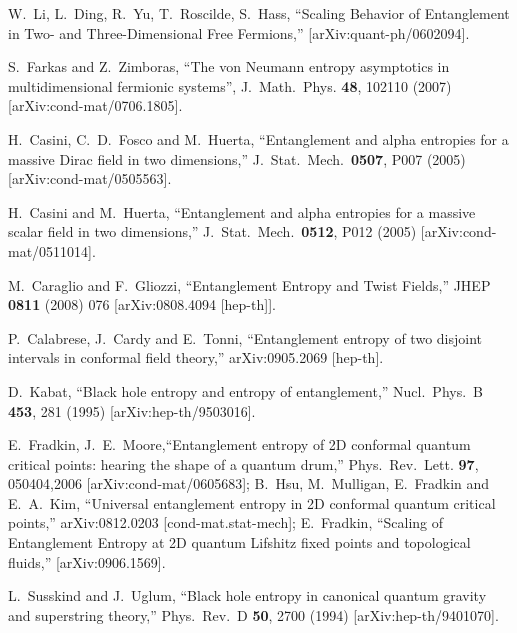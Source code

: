 \documentclass[12pt]{article}
\begin{document}
\begin{thebibliography}{99}
W.\ Li, L.\ Ding, R.\ Yu, T.\ Roscilde, S.\ Hass,
``Scaling Behavior
of Entanglement in Two- and Three-Dimensional Free Fermions,''
[arXiv:quant-ph/0602094].

S.\ Farkas and Z.\ Zimboras,
``The von Neumann entropy asymptotics in multidimensional fermionic systems'',
J.\ Math.\ Phys. {\bf 48},  102110 (2007)
 [arXiv:cond-mat/0706.1805].


H.~Casini, C.~D.~Fosco and M.~Huerta,
  ``Entanglement and alpha entropies for a massive Dirac field in two
  dimensions,''
  J.\ Stat.\ Mech.\  {\bf 0507}, P007 (2005)
  [arXiv:cond-mat/0505563].



  H.~Casini and M.~Huerta,
  ``Entanglement and alpha entropies for a massive scalar field in two
  dimensions,''
  J.\ Stat.\ Mech.\  {\bf 0512}, P012 (2005)
  [arXiv:cond-mat/0511014].

  M.~Caraglio and F.~Gliozzi,
  ``Entanglement Entropy and Twist Fields,''
  JHEP {\bf 0811} (2008) 076
  [arXiv:0808.4094 [hep-th]].


  P.~Calabrese, J.~Cardy and E.~Tonni,
  ``Entanglement entropy of two disjoint intervals in conformal field
theory,''
  arXiv:0905.2069 [hep-th].




 D.~Kabat,
  ``Black hole entropy and entropy of entanglement,''
  Nucl.\ Phys.\ B {\bf 453}, 281 (1995)
  [arXiv:hep-th/9503016].




E.~Fradkin, J.~E.~Moore,``Entanglement entropy of 2D conformal quantum critical points: 
hearing the shape of a quantum drum,'' 
Phys.\ Rev.\ Lett. {\bf 97}, 050404,2006
[arXiv:cond-mat/0605683];
B.~Hsu, M.~Mulligan, E.~Fradkin and E.~A.~Kim,
  ``Universal entanglement entropy in 2D conformal quantum critical points,''
  arXiv:0812.0203 [cond-mat.stat-mech];
E.~Fradkin, ``Scaling of Entanglement Entropy at 2D quantum Lifshitz fixed points and topological fluids,''
[arXiv:0906.1569].
 


 

  L.~Susskind and J.~Uglum,
  ``Black hole entropy in canonical quantum gravity and superstring theory,''
  Phys.\ Rev.\ D {\bf 50}, 2700 (1994)
  [arXiv:hep-th/9401070].



\end{thebibliography}
\end{document}
